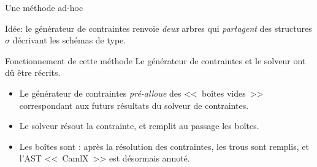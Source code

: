 \documentclass[final]{beamer}
\newcommand{\red}[1]{\textcolor[HTML]{F7800A}{#1}}
\begin{document}
\newcommand{\redsigma}{\ensuremath{\red{\boldsymbol\sigma}}}

\begin{frame}{Une méthode ad-hoc}
  \begin{center}
    \footnotesize
  \end{center}
  Idée: le générateur de contraintes renvoie \emph{deux} arbres qui
  \emph{\red{partagent}} des structures \red{$\sigma$} décrivant les schémas de type.
\end{frame}

\begin{frame}{Fonctionnement de cette méthode}
  Le générateur de contraintes et le solveur ont dû être récrits.
  \begin{itemize}
    \item Le générateur de contraintes \emph{pré-alloue} des <<~boîtes vides~>>
      correspondant aux futurs résultats du solveur de contraintes.
    \item Le solveur résout la contrainte, et remplit au passage les boîtes.
    \item Les boîtes sont \underline{}: après la résolution des
      contraintes, les trous sont remplis, et l'AST <<~CamlX~>> est désormais annoté.
  \end{itemize}
\end{frame}
\end{document}
